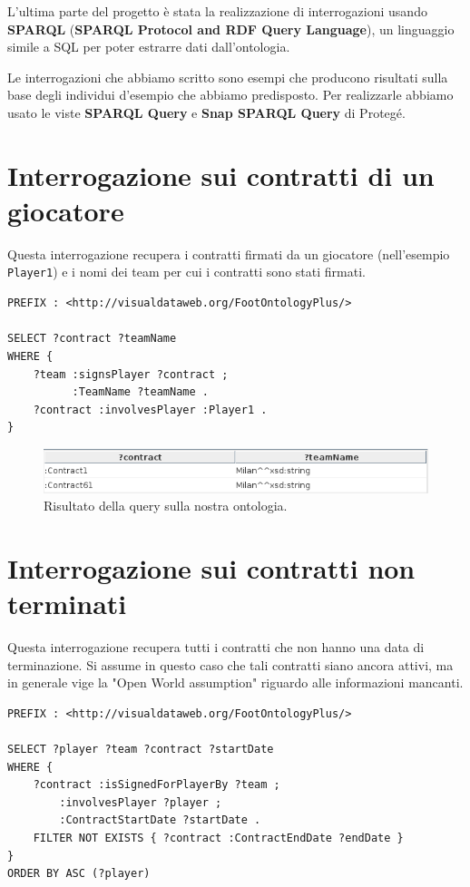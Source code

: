 \documentclass[11pt]{report} %
\begin{document}
L'ultima parte del progetto è stata la realizzazione di interrogazioni usando \textbf{SPARQL} (\textbf{SPARQL Protocol and RDF Query Language}), un linguaggio simile a SQL per poter estrarre dati dall'ontologia.

\hfill

Le interrogazioni che abbiamo scritto sono esempi che producono risultati sulla base degli individui d'esempio che abbiamo predisposto. 
Per realizzarle abbiamo usato le viste \textbf{SPARQL Query} e \textbf{Snap SPARQL Query} di Protegé. 

\section{Interrogazione sui contratti di un giocatore}

Questa interrogazione recupera i contratti firmati da un giocatore (nell'esempio \texttt{Player1}) e i nomi dei team per cui i contratti sono stati firmati. 

\begin{lstlisting}
PREFIX : <http://visualdataweb.org/FootOntologyPlus/>

SELECT ?contract ?teamName
WHERE { 
    ?team :signsPlayer ?contract ;
          :TeamName ?teamName .
    ?contract :involvesPlayer :Player1 .
}
\end{lstlisting}

\begin{figure}[H]
	\includegraphics[width=\textwidth]{query1}
	\caption{Risultato della query sulla nostra ontologia.}
\end{figure}

\newpage

\section{Interrogazione sui contratti non terminati}

Questa interrogazione recupera tutti i contratti che non hanno una data di terminazione. Si assume in questo caso che tali contratti siano ancora attivi, ma in generale vige la "Open World assumption" riguardo alle informazioni mancanti.

\begin{lstlisting}
PREFIX : <http://visualdataweb.org/FootOntologyPlus/>

SELECT ?player ?team ?contract ?startDate
WHERE { 
    ?contract :isSignedForPlayerBy ?team ;
        :involvesPlayer ?player ;
        :ContractStartDate ?startDate .
    FILTER NOT EXISTS { ?contract :ContractEndDate ?endDate }
}
ORDER BY ASC (?player)
\end{lstlisting}
\end{document}
